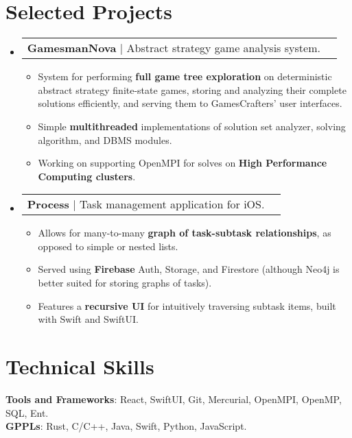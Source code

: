 \documentclass[letterpaper,11pt]{article}
\makeatletter
\newcommand{\resumeItem}[1]{
  \item\small{
    {#1 \vspace{-2pt}}
  }
}
\newcommand{\resumeProjectHeading}[1]{
    \item
    \begin{tabular*}{0.97\textwidth}{l@{\extracolsep{\fill}}r}
      \small#1 \\
    \end{tabular*}\vspace{-7pt}
}
\newcommand{\resumeSubHeadingListStart}{\begin{itemize}[leftmargin=0.15in, label={}]}
\newcommand{\resumeSubHeadingListEnd}{\end{itemize}}
\newcommand{\resumeItemListStart}{\begin{itemize}}
\newcommand{\resumeItemListEnd}{\end{itemize}\vspace{-5pt}}
\makeatother
\begin{document}
\section{Selected Projects}
    \resumeSubHeadingListStart
          \resumeProjectHeading
          {\textbf{GamesmanNova} $|$ Abstract strategy game analysis system.}
          \resumeItemListStart
            \resumeItem{System for performing \textbf{full game tree exploration} on deterministic abstract strategy finite-state games, storing and analyzing their complete solutions efficiently, and serving them to GamesCrafters' user interfaces.}
            \resumeItem{Simple \textbf{multithreaded} implementations of solution set analyzer, solving algorithm, and DBMS modules.}
            \resumeItem{Working on supporting OpenMPI for solves on \textbf{High Performance Computing clusters}.}
          \resumeItemListEnd
      \resumeProjectHeading
          {\textbf{Process} $|$ Task management application for iOS.}
          \resumeItemListStart
            \resumeItem{Allows for many-to-many \textbf{graph of task-subtask relationships}, as opposed to simple or nested lists.}
            \resumeItem{Served using \textbf{Firebase} Auth, Storage, and Firestore (although Neo4j is better suited for storing graphs of tasks).}
            \resumeItem{Features a \textbf{recursive UI} for intuitively traversing subtask items, built with Swift and SwiftUI.}
          \resumeItemListEnd
    \resumeSubHeadingListEnd
%
\section{Technical Skills}
 \begin{itemize}[leftmargin=0.15in, label={}]
    \small{\item{
     \textbf{Tools and Frameworks}{: React, SwiftUI, Git, Mercurial, OpenMPI, OpenMP, SQL, Ent.} \\
     \textbf{GPPLs}{: Rust, C/C++, Java, Swift, Python, JavaScript.} \\
    }}
 \end{itemize}


\end{document}
